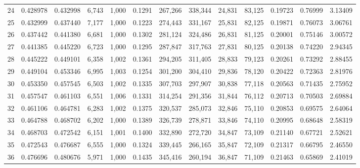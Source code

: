 \begin{tabular}{rrrrrrrrrrrrr}
24  &  0.428978 &  0.432998 &   6,743 &  1,000 &                                     0.1291 &  267,266 &  338,344 &   24,831 &   83,125 &  0.19723 &  0.76999 &  3.13409 \\
25  &  0.432999 &  0.437440 &   7,177 &  1,000 &                                     0.1223 &  274,443 &  331,167 &   25,831 &   82,125 &  0.19871 &  0.76073 &  3.06761 \\
26  &  0.437442 &  0.441380 &   6,681 &  1,000 &                                     0.1302 &  281,124 &  324,486 &   26,831 &   81,125 &  0.20001 &  0.75146 &  3.00572 \\
27  &  0.441385 &  0.445220 &   6,723 &  1,000 &                                     0.1295 &  287,847 &  317,763 &   27,831 &   80,125 &  0.20138 &  0.74220 &  2.94345 \\
28  &  0.445222 &  0.449101 &   6,358 &  1,002 &                                     0.1361 &  294,205 &  311,405 &   28,833 &   79,123 &  0.20261 &  0.73292 &  2.88455 \\
29  &  0.449104 &  0.453346 &   6,995 &  1,003 &                                     0.1254 &  301,200 &  304,410 &   29,836 &   78,120 &  0.20422 &  0.72363 &  2.81976 \\
30  &  0.453350 &  0.457545 &   6,503 &  1,002 &                                     0.1335 &  307,703 &  297,907 &   30,838 &   77,118 &  0.20563 &  0.71435 &  2.75952 \\
31  &  0.457547 &  0.461103 &   6,551 &  1,006 &                                     0.1331 &  314,254 &  291,356 &   31,844 &   76,112 &  0.20713 &  0.70503 &  2.69884 \\
32  &  0.461106 &  0.464781 &   6,283 &  1,002 &                                     0.1375 &  320,537 &  285,073 &   32,846 &   75,110 &  0.20853 &  0.69575 &  2.64064 \\
33  &  0.464788 &  0.468702 &   6,202 &  1,000 &                                     0.1389 &  326,739 &  278,871 &   33,846 &   74,110 &  0.20995 &  0.68648 &  2.58319 \\
34  &  0.468703 &  0.472542 &   6,151 &  1,001 &                                     0.1400 &  332,890 &  272,720 &   34,847 &   73,109 &  0.21140 &  0.67721 &  2.52621 \\
35  &  0.472543 &  0.476687 &   6,555 &  1,000 &                                     0.1324 &  339,445 &  266,165 &   35,847 &   72,109 &  0.21317 &  0.66795 &  2.46550 \\
36  &  0.476696 &  0.480676 &   5,971 &  1,000 &                                     0.1435 &  345,416 &  260,194 &   36,847 &   71,109 &  0.21463 &  0.65869 &  2.41019 \\

\end{tabular}
